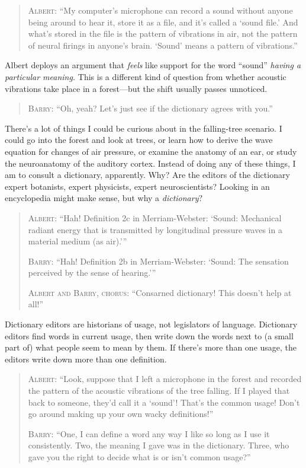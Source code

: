 \begin{quotation}
{
 \textsc{Albert}: ``My computer's
microphone can record a sound without anyone being around to hear it,
store it as a file, and it's called a
`sound file.' And what's
stored in the file is the pattern of vibrations in air, not the pattern
of neural firings in anyone's brain.
`Sound' means a pattern of
vibrations.''}
\end{quotation}

{
 Albert deploys an argument that \textit{feels} like support for
the word ``sound'' \textit{having a
particular meaning.} This is a different kind of question from whether
acoustic vibrations take place in a forest---but the shift usually
passes unnoticed.}

\begin{quotation}
{
 \textsc{Barry}: ``Oh, yeah? Let's just see
 if the dictionary agrees with you.''}
\end{quotation}

{
 There's a lot of things I could be curious about
in the falling-tree scenario. I could go into the forest and look at
trees, or learn how to derive the wave equation for changes of air
pressure, or examine the anatomy of an ear, or study the neuroanatomy
of the auditory cortex. Instead of doing any of these things, I am to
consult a dictionary, apparently. Why? Are the editors of the
dictionary expert botanists, expert physicists, expert neuroscientists?
Looking in an encyclopedia might make sense, but why a
\textit{dictionary}?}

\begin{quotation}
{
 \textsc{Albert}: ``Hah! Definition 2c in Merriam-Webster:
`Sound: Mechanical radiant energy that is transmitted by
longitudinal pressure waves in a material medium (as
air).'''}

{
 \textsc{Barry}: ``Hah! Definition 2b in Merriam-Webster:
`Sound: The sensation perceived by the sense of
hearing.'''}

{
 \textsc{Albert and Barry, chorus}: ``Consarned dictionary!
 This doesn't help at all!''}
\end{quotation}

{
 Dictionary editors are historians of usage, not legislators of
language. Dictionary editors find words in current usage, then write
down the words next to (a small part of) what people seem to mean by
them. If there's more than one usage, the editors write
down more than one definition.}

\begin{quotation}
{
 \textsc{Albert}: ``Look, suppose that I left a microphone
in the forest and recorded the pattern of the acoustic vibrations of
the tree falling. If I played that back to someone,
they'd call it a
`sound'! That's the
common usage! Don't go around making up your own wacky
definitions!''}

{
 \textsc{Barry}: ``One, I can define a word any way I like
so long as I use it consistently. Two, the meaning I gave was in the
dictionary. Three, who gave you the right to decide what is or
isn't common usage?''}
\end{quotation}


